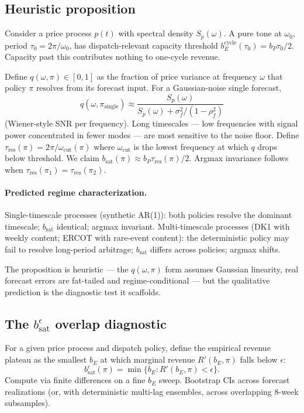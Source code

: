 \documentclass[11pt]{article}
\begin{document}
\subsection{Heuristic proposition}

Consider a price process $p(t)$ with spectral density $S_p(\omega)$. A pure tone at $\omega_0$, period $\tau_0 = 2\pi/\omega_0$, has dispatch-relevant capacity threshold $b_E^{\mathrm{cycle}}(\tau_0) = b_P \tau_0 / 2$. Capacity past this contributes nothing to one-cycle revenue.

Define $q(\omega, \pi) \in [0, 1]$ as the fraction of price variance at frequency $\omega$ that policy $\pi$ resolves from its forecast input. For a Gaussian-noise single forecast,
\[
q(\omega, \pi_{\mathrm{single}}) \approx \frac{S_p(\omega)}{S_p(\omega) + \sigma_f^2 / (1 - \rho_f^2)}
\]
(Wiener-style SNR per frequency). Long timescales --- low frequencies with signal power concentrated in fewer modes --- are most sensitive to the noise floor. Define $\tau_{\mathrm{res}}(\pi) = 2\pi / \omega_{\mathrm{cut}}(\pi)$ where $\omega_{\mathrm{cut}}$ is the lowest frequency at which $q$ drops below threshold. We claim $b_{\mathrm{sat}}(\pi) \approx b_P \tau_{\mathrm{res}}(\pi) / 2$. Argmax invariance follows when $\tau_{\mathrm{res}}(\pi_1) = \tau_{\mathrm{res}}(\pi_2)$.

\paragraph{Predicted regime characterization.} Single-timescale processes (synthetic AR(1)): both policies resolve the dominant timescale; $b_{\mathrm{sat}}$ identical; argmax invariant. Multi-timescale processes (DK1 with weekly content; ERCOT with rare-event content): the deterministic policy may fail to resolve long-period arbitrage; $b_{\mathrm{sat}}$ differs across policies; argmax shifts.

The proposition is heuristic --- the $q(\omega, \pi)$ form assumes Gaussian linearity, real forecast errors are fat-tailed and regime-conditional --- but the qualitative prediction is the diagnostic test it scaffolds.

\subsection{The $b_{\mathrm{sat}}^\epsilon$ overlap diagnostic}\label{sec:diagnostic}

For a given price process and dispatch policy, define the empirical revenue plateau as the smallest $b_E$ at which marginal revenue $R'(b_E, \pi)$ falls below $\epsilon$:
\[
b_{\mathrm{sat}}^\epsilon(\pi) = \min \{ b_E : R'(b_E, \pi) < \epsilon \}.
\]
Compute via finite differences on a fine $b_E$ sweep. Bootstrap CIs across forecast realizations (or, with deterministic multi-lag ensembles, across overlapping 8-week subsamples).
\end{document}
